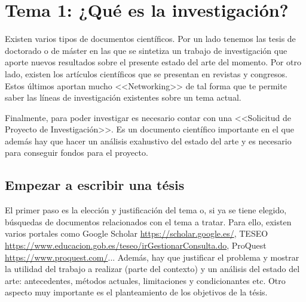 
\newcommand{\estudiante}{García Justel, Alan}
\newcommand{\titulo}{MÁSTER EN INGENIERÍA COMPUTACIONAL Y SISTEMAS INTELIGENTES}
\newcommand{\asignatura}{METODOLOGÍAS Y TÉCNICAS DE INVESTIGACIÓN}
\newcommand{\portada}{common/no_signal.png}
\newcommand{\colorportada}{title_red}
\newcommand{\curso}{2024-2025}





\newpage


\section{Tema 1: ¿Qué es la investigación?}
Existen varios tipos de documentos científicos. Por un lado tenemos las tesis de doctorado o de máster en las que se sintetiza un trabajo de investigación que aporte nuevos resultados sobre el presente estado del arte del momento. Por otro lado, existen los artículos científicos que se presentan en revistas y congresos. Estos últimos aportan mucho <<Networking>> de tal forma que te permite saber las líneas de investigación existentes sobre un tema actual.

Finalmente, para poder investigar es necesario contar con una <<Solicitud de Proyecto de Investigación>>. Es un documento científico importante en el que además hay que hacer un análisis exahustivo del estado del arte y es necesario para conseguir fondos para el proyecto. 

\subsection{Empezar a escribir una tésis}
El primer paso es la elección y justificación del tema o, si ya se tiene elegido, búsquedas de documentos relacionados con el tema a tratar. Para ello, existen varios portales como Google Scholar \url{https://scholar.google.es/}, TESEO \url{https://www.educacion.gob.es/teseo/irGestionarConsulta.do}, ProQuest \url{https://www.proquest.com/}... Además, hay que justificar el problema y mostrar la utilidad del trabajo a realizar (parte del contexto) y un análisis del estado del arte: antecedentes, métodos actuales, limitaciones y condicionantes etc. Otro aspecto muy importante es el planteamiento de los objetivos de la tésis.

